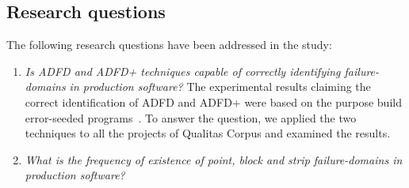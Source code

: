 \documentclass[conference]{IEEEtran}
\begin{document}
\subsection{Research questions} \label{sec:questions}
The following research questions have been addressed in the study:
\begin{enumerate}
%
\item \textit{Is ADFD and ADFD+ techniques capable of correctly identifying failure-domains in production software?} The experimental results claiming the correct identification of ADFD and ADFD+ were based on the purpose build error-seeded programs~\cite{}. To answer the question, we applied the two techniques to all the projects of Qualitas Corpus and examined the results.
%
\item \textit{What is the frequency of existence of point, block and strip failure-domains in production software?}


\end{enumerate}
\end{document}
